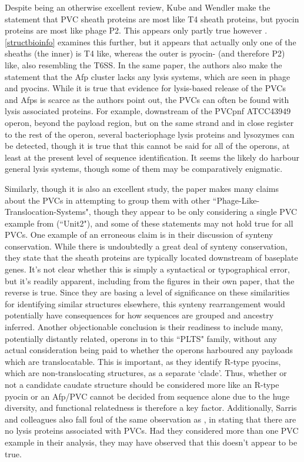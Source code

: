 Despite being an otherwise excellent review, Kube and Wendler make the statement that  PVC sheath proteins are most like T4 sheath proteins, but pyocin proteins are most like phage P2. This appears only partly true however \citep{Kube2015}. \vref{structbioinfo} examines this further, but it appears that actually only one of the sheaths (the inner) is T4 like, whereas the outer is pyocin- (and therefore P2) like, also resembling the T6SS. In the same paper, the authors also make the statement that the Afp cluster lacks any lysis systems, which are seen in phage and pyocins. While it is true that evidence for lysis-based release of the PVCs and Afps is scarce as the authors point out, the PVCs can often be found with lysis associated proteins. For example, downstream of the PVCpnf ATCC43949 operon, beyond the payload region, but on the same strand and in close register to the rest of the operon, several bacteriophage lysis proteins and lysozymes can be detected, though it is true that this cannot be said for all of the operons, at least at the present level of sequence identification. It seems the likely do harbour general lysis systems, though some of them may be comparatively enigmatic.

Similarly, though it is also an excellent study, the \cite{Sarris2014} paper makes many claims about the PVCs in attempting to group them with other ``Phage-Like-Translocation-Systems", though they appear to be only considering a single PVC example from \Plum{} (``Unit2"), and some of these statements may not hold true for all PVCs. One example of an erroneous claim is in their discussion of synteny conservation. While there is undoubtedly a great deal of synteny conservation, they state that the sheath proteins are typically located downstream of baseplate genes. It's not clear whether this is simply a syntactical or typographical error, but it's readily apparent, including from the figures in their own paper, that the reverse is true. Since they are basing a level of significance on these similarities for identifying similar structures elsewhere, this synteny rearrangement would potentially have consequences for how sequences are grouped and ancestry inferred. Another objectionable conclusion is their readiness to include many, potentially distantly related, operons in to this ``PLTS" family, without any actual consideration being paid to whether the operons harboured any payloads which are translocatable. This is important, as they identify R-type pyocins, which are non-translocating structures, as a separate `clade'. Thus, whether or not a candidate caudate structure should be considered more like an R-type pyocin or an Afp/PVC cannot be decided from sequence alone due to the huge diversity, and functional relatedness is therefore a key factor. Additionally, Sarris and colleagues also fall foul of the same observation as \cite{Kube2015}, in stating that there are no lysis proteins associated with PVCs. Had they considered more than one PVC example in their analysis, they may have observed that this doesn't appear to be true.

